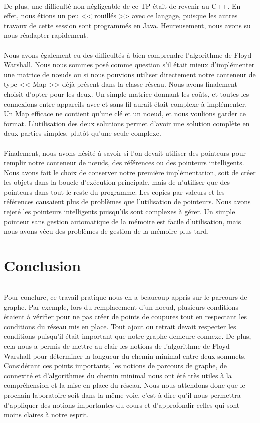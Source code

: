 \documentclass[10pt,letterpaper]{article}
\begin{document}
\\
De plus, une difficulté non négligeable de ce TP était de revenir au C++. 
En effet, nous étions un peu << rouillés >> avec ce langage, puisque les autres travaux de cette session sont programmés en Java. 
Heureusement, nous avons su nous réadapter rapidement.\\
\\
Nous avons également eu des difficultés à bien comprendre l’algorithme de Floyd-Warshall. 
Nous nous sommes posé comme question s’il était mieux d’implémenter une matrice de nœuds 
ou si nous pouvions utiliser directement notre conteneur de type << Map >> déjà présent dans la classe réseau. 
Nous avons finalement choisit d’opter pour les deux. Un simple matrice donnant les coûts, 
et toutes les connexions entre appareils avec et sans fil aurait était complexe à implémenter. 
Un Map efficace ne contient qu’une clé et un noeud, et nous voulions garder ce format. 
L’utilisation des deux solutions permet d’avoir une solution complète en deux parties simples, plutôt qu’une seule complexe.\\
\\
Finalement, nous avons hésité à savoir si l’on devait utiliser des pointeurs pour remplir notre conteneur de nœuds, 
des références ou des pointeurs intelligents. 
Nous avons fait le choix de conserver notre première implémentation, soit de créer les objets dans la boucle d’exécution principale, 
mais de n’utiliser que des pointeurs dans tout le reste du programme. 
Les copies par valeurs et les références causaient plus de problèmes que l’utilisation de pointeurs. 
Nous avons rejeté les pointeurs intelligents puisqu’ils sont complexes à gérer. 
Un simple pointeur sans gestion automatique de la mémoire est facile d’utilisation, mais nous avons vécu des problèmes de gestion de la mémoire plus tard.



\newpage
\section{Conclusion}
\hrule
\vspace{1em}
Pour conclure, ce travail pratique nous en a beaucoup appris sur le parcours de graphe. 
Par exemple, lors du remplacement d’un noeud, plusieurs conditions étaient à vérifier pour ne pas 
créer de points de coupures tout en respectant les conditions du réseau mis en place. 
Tout ajout ou retrait devait respecter les conditions puisqu’il était important que notre graphe demeure connexe. 
De plus, cela nous a permis de mettre au clair les notions de l’algorithme de Floyd-Warshall pour déterminer la longueur du chemin minimal entre deux sommets. 
Considérant ces points importants, les notions de parcours de graphe, de connexité et d’algorithmes 
du chemin minimal nous ont été très utiles à la compréhension et la mise en place du réseau. 
Nous nous attendons donc que le prochain laboratoire soit dans la même voie, 
c’est-à-dire qu’il nous permettra d’appliquer des notions importantes du cours et d’approfondir celles qui sont moins claires à notre esprit. 
\end{document}
